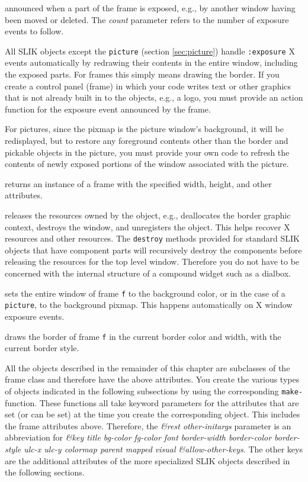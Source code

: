 \documentclass[twoside,openright,11pt]{report}
\newcommand{\tp}[1]{\texttt{#1}}
\begin{document}
 \label{pg:frameann}

{announced when a part of the frame is exposed, e.g., by another
window having been moved or deleted.  The \emph{count} parameter
refers to the number of exposure events to follow.}

All SLIK objects except the \tp{picture} (section \ref{sec:picture})
handle \tp{:exposure} X events automatically by redrawing their
contents in the entire window, including the exposed parts.  For
frames this simply means drawing the border.  If you create a control
panel (frame) in which your code writes text or other graphics that is
not already built in to the objects, e.g., a logo, you must provide an
action function for the exposure event announced by the frame.

For pictures, since the pixmap is the picture window's background, it
will be redisplayed, but to restore any foreground contents other than
the border and pickable objects in the picture, you must provide your
own code to refresh the contents of newly exposed portions of the
window associated with the picture.


\label{pg:makeframe}
{returns an instance of a frame with the specified width, height, and
other attributes.}

{releases the resources owned by the object, e.g., deallocates the
border graphic context, destroys the window, and unregisters the
object.  This helps recover X resources and other resources.  The
\tp{destroy} methods provided for standard SLIK objects that have
component parts will recursively destroy the components before
releasing the resources for the top level window.  Therefore you do
not have to be concerned with the internal structure of a compound
widget such as a dialbox.}

{sets the entire window of frame \tp{f} to the background color,
or in the case of a \tp{picture}, to the background pixmap.  This
happens automatically on X window exposure events.}

{draws the border of frame \tp{f} in the current border color and
width, with the current border style.}

All the objects described in the remainder of this chapter are
subclasses of the frame class and therefore have the above attributes.
You create the various types of objects indicated in the following
subsections by using the corresponding \tp{make-} function.  These
functions all take keyword parameters for the attributes that are set
(or can be set) at the time you create the corresponding object.  This
includes the frame attributes above.  Therefore, the \textit{\&rest
other-initargs} parameter is an abbreviation for \textit{\&key title
bg-color fg-color font border-width border-color border-style ulc-x
ulc-y colormap parent mapped visual \&allow-other-keys}.  The other
keys are the additional attributes of the more specialized SLIK
objects described in the following sections.
\end{document}
